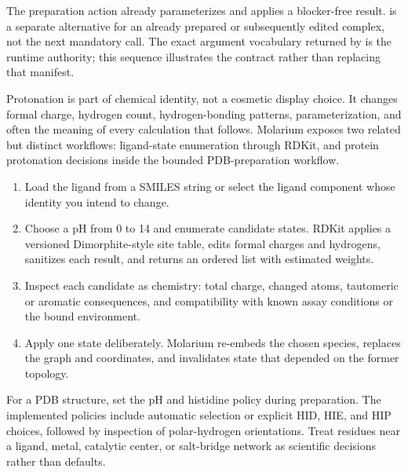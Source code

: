 \documentclass[11pt]{article}
\begin{document}
The preparation action already parameterizes and applies a blocker-free result.  is a separate alternative for an already prepared or subsequently edited complex, not the next mandatory call. The exact argument vocabulary returned by  is the runtime authority; this sequence illustrates the contract rather than replacing that manifest.


Protonation is part of chemical identity, not a cosmetic display choice. It changes formal charge, hydrogen count, hydrogen-bonding patterns, parameterization, and often the meaning of every calculation that follows. Molarium exposes two related but distinct workflows: ligand-state enumeration through RDKit, and protein protonation decisions inside the bounded PDB-preparation workflow.


\begin{enumerate}
\item Load the ligand from a SMILES string or select the ligand component whose identity you intend to change.
\item Choose a pH from 0 to 14 and enumerate candidate states. RDKit applies a versioned Dimorphite-style site table, edits formal charges and hydrogens, sanitizes each result, and returns an ordered list with estimated weights.
\item Inspect each candidate as chemistry: total charge, changed atoms, tautomeric or aromatic consequences, and compatibility with known assay conditions or the bound environment.
\item Apply one state deliberately. Molarium re-embeds the chosen species, replaces the graph and coordinates, and invalidates state that depended on the former topology.
\end{enumerate}


For a PDB structure, set the pH and histidine policy during preparation. The implemented policies include automatic selection or explicit HID, HIE, and HIP choices, followed by inspection of polar-hydrogen orientations. Treat residues near a ligand, metal, catalytic center, or salt-bridge network as scientific decisions rather than defaults.
\end{document}

